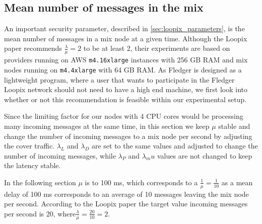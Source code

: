 \documentclass[a4paper,11pt,oneside]{report}
\begin{document}
\subsection{Mean number of messages in the mix}
An important security parameter, described in \autoref{sec:loopix_parameters}, is the mean number of messages in a mix node at a given time. Although the Loopix paper recommends \(\frac{\lambda}{\mu} = 2\) to be at least 2, their experiments are based on providers running on AWS \texttt{m4.16xlarge} instances with 256 GB RAM and mix nodes running on \texttt{m4.4xlarge} with 64 GB RAM. As Fledger is designed as a lightweight program, where a user that wants to participate in the Fledger Loopix network should not need to have a high end machine, we first look into whether or not this recommendation is feasible within our experimental setup.

Since the limiting factor for our nodes with 4 CPU cores would be processing many incoming messages at the same time, in this section we keep \(\mu\) stable and change the number of incoming messages to a mix node per second by adjusting the cover traffic. \(\lambda_L\) and \(\lambda_D\) are set to the same values and adjusted to change the number of incoming messages, while \(\lambda_P\) and \(\lambda_mu\) values are not changed to keep the latency stable.

In the following section \(\mu\) is to 100 ms, which corresponds to a \(\frac{1}{\mu} = \frac{1}{10}\) as a mean delay of 100 ms corresponds to an average of 10 messages leaving the mix node per second. According to the Loopix paper the target value incoming messages per second is 20, where\(\frac{\lambda}{\mu} = \frac{20}{10} = 2\).
\end{document}
